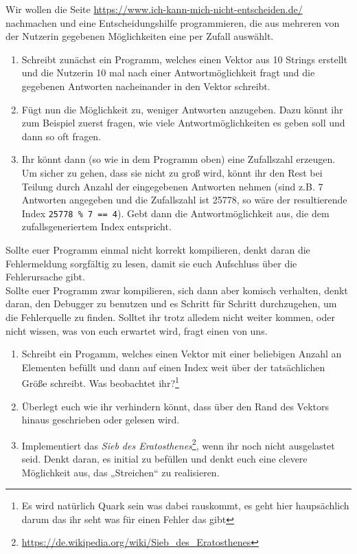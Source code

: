 \begin{praxis}

	Wir wollen die Seite \url{https://www.ich-kann-mich-nicht-entscheiden.de/} nachmachen und eine Entscheidungshilfe programmieren, die aus mehreren von der Nutzerin gegebenen Möglichkeiten eine per Zufall auswählt.

	\begin{enumerate}
		\item
		      Schreibt zunächst ein Programm, welches einen Vektor aus 10 Strings erstellt und die Nutzerin 10 mal nach einer Antwortmöglichkeit fragt und die gegebenen Antworten nacheinander in den Vektor schreibt.
		\item
		      Fügt nun die Möglichkeit zu, weniger Antworten anzugeben.
		      Dazu könnt ihr zum Beispiel zuerst fragen, wie viele Antwortmöglichkeiten es geben soll und dann so oft fragen.
		\item
		      Ihr könnt dann (so wie in dem Programm oben) eine Zufallszahl erzeugen.
		      Um sicher zu gehen, dass sie nicht zu groß wird, könnt ihr den Rest bei Teilung durch Anzahl der eingegebenen Antworten nehmen (sind z.B. 7 Antworten angegeben und die Zufallszahl ist 25778, so wäre der resultierende Index \texttt{25778 \% 7 == 4}).
		      Gebt dann die Antwortmöglichkeit aus, die dem zufallsgeneriertem Index entspricht.
	\end{enumerate}
\end{praxis}

Sollte euer Programm einmal nicht korrekt kompilieren, denkt daran die Fehlermeldung sorgfältig zu lesen, damit sie euch Aufschluss über die Fehlerursache gibt.\\
Sollte euer Programm zwar kompilieren, sich dann aber komisch verhalten, denkt daran, den Debugger zu benutzen und es Schritt für Schritt durchzugehen, um die Fehlerquelle zu finden. Solltet ihr trotz alledem nicht weiter kommen, oder nicht wissen, was von euch erwartet wird, fragt einen von uns.


\begin{spiel}
\begin{enumerate}
	\item
		Schreibt ein Progamm, welches einen Vektor mit einer beliebigen Anzahl an Elementen befüllt und dann auf einen Index weit über der tatsächlichen Größe schreibt.
		Was beobachtet ihr?\footnote{Es wird natürlich Quark sein was dabei rauskommt, es geht hier haupsächlich darum das ihr seht was für einen Fehler das gibt}
	\item 
		Überlegt euch wie ihr verhindern könnt, dass über den Rand des Vektors hinaus geschrieben oder gelesen wird. 
	\item
		Implementiert das \emph{Sieb des Eratosthenes}\footnote{\url{https://de.wikipedia.org/wiki/Sieb_des_Eratosthenes}}, wenn ihr noch nicht ausgelastet seid.
		Denkt daran, es initial zu befüllen und denkt euch eine clevere Möglichkeit aus, das „Streichen“ zu realisieren.
\end{enumerate}
\end{spiel}

